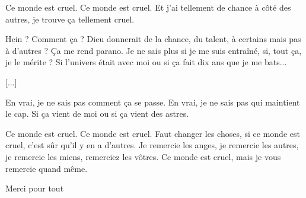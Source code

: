 {Ce monde est cruel.
Ce monde est cruel.
Et j'ai tellement de chance à côté des autres,
je trouve ça tellement cruel.

Hein ? Comment ça ? Dieu donnerait de la chance, du talent,
à certains mais pas à d'autres ? Ça me rend parano.
Je ne sais plus si je me suis entraîné, si, tout ça, je le mérite ?
Si l'univers était avec moi ou si ça fait dix ans que je me bats...

[...]

En vrai, je ne sais pas comment ça se passe.
En vrai, je ne sais pas qui maintient le cap.
Si ça vient de moi ou si ça vient des astres.

Ce monde est cruel.
Ce monde est cruel.
Faut changer les choses, si ce monde est cruel,
c'est sûr qu'il y en a d'autres.
Je remercie les anges, je remercie les autres,
je remercie les miens, remerciez les vôtres.
Ce monde est cruel, mais je vous remercie quand même.

Merci pour tout
}

